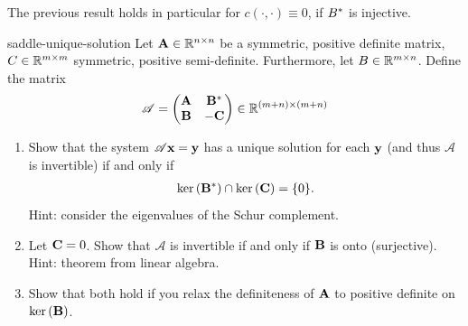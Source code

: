 \begin{remark}
  The previous result holds in particular for
  $c(\cdot,\cdot) \equiv 0$, if $B^*$ is injective.
\end{remark}

\begin{Problem}{saddle-unique-solution}
  Let $\mathbf A \in \mathbb R^{n\times n}$ be a symmetric, positive definite
  matrix, $C\in \mathbb R^{m\times m}$ symmetric, positive
  semi-definite. Furthermore, let $B \in \mathbb R^{m\times n}$. Define the matrix
  \begin{gather}
    \mathscr A= 
    \begin{pmatrix}
      \mathbf A & \mathbf B^* \\ \mathbf B & -\mathbf C
    \end{pmatrix}
    \in \mathbb R^{(m+n)\times (m+n)}
  \end{gather}
  \begin{enumerate}
  \item Show that the system $\mathscr A \mathbf x = \mathbf y$ has a unique
    solution for each $\mathbf y$ (and thus $\mathscr A$ is invertible) if
    and only if
    \begin{gather}
      \operatorname{ker}\left(\mathbf B^*\right) \cap \operatorname{ker}\left(\mathbf C\right) = \{0\}.
    \end{gather}
    Hint: consider the eigenvalues of the Schur complement.
  \item Let $\mathbf C = 0$. Show that $\mathscr A$ is invertible if and
    only if $\mathbf B$ is onto (surjective). Hint: theorem from linear
    algebra.
  \item Show that both hold if you relax the definiteness of $\mathbf A$ to
    positive definite on $\operatorname{ker}\left(\mathbf B\right)$.
  \end{enumerate}
\end{Problem}


